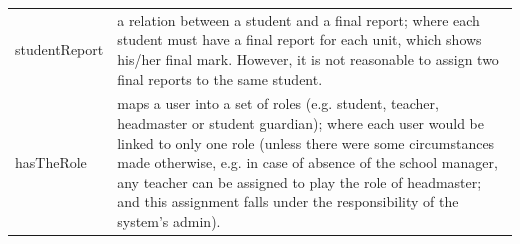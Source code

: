\begin{table}[bth]
\begin{tabular}{p{0.9 in} p{5.9 in}}
studentReport &  a relation between a student and a final report; where each student must have a final report for each unit, which shows his/her final mark.  However, it is not reasonable to assign two final reports to the same student.\\

hasTheRole & maps a user into a set of roles (e.g. student, teacher, headmaster or student guardian); where each user would be linked to only one role (unless there were some circumstances made otherwise, e.g. in case of absence of the school manager, any teacher can be assigned to play the role of headmaster; and this assignment falls under the responsibility of the system’s admin).

\\ \hline\hline
\end{tabular}
\label{tab:relations}
\end{table}








